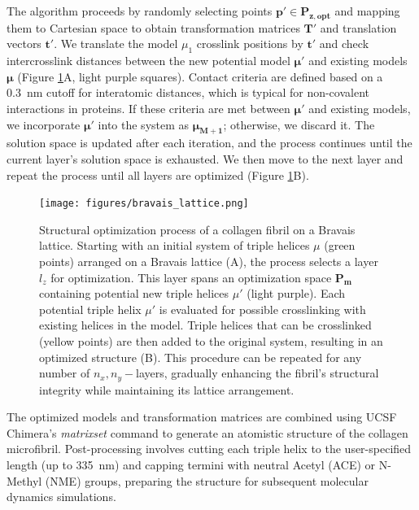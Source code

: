 \documentclass[10pt,letterpaper]{article}
\begin{document}
The algorithm proceeds by randomly selecting points \(\bm{p'} \in \bm{P_{z,\text{opt}}}\) and mapping them to Cartesian space to obtain transformation matrices \(\bm{T'}\) and translation vectors \(\bm{t'}\). We translate the model \(\mu_1\) crosslink positions by \(\bm{t'}\) and check intercrosslink distances between the new potential model \(\bm{\mu'}\) and existing models \(\bm{\mu}\) (Figure \ref{fig:bravais_lattice}A, light purple squares). Contact criteria are defined based on a \SI{0.3}{\nano\meter} cutoff for interatomic distances, which is typical for non-covalent interactions in proteins. If these criteria are met between \(\bm{\mu'}\) and existing models, we incorporate \(\bm{\mu'}\) into the system as \(\bm{\mu_{M+1}}\); otherwise, we discard it. The solution space is updated after each iteration, and the process continues until the current layer's solution space is exhausted. We then move to the next layer and repeat the process until all layers are optimized (Figure \ref{fig:bravais_lattice}B).

\begin{figure}[!t]
    \centering
    \texttt{[image: figures/bravais\_lattice.png]}
    \caption{Structural optimization process of a collagen fibril on a Bravais lattice. Starting with an initial system of triple helices \(\mu\) (green points) arranged on a Bravais lattice (A), the process selects a layer \(l_z\) for optimization. This layer spans an optimization space \(\bm{P_m}\) containing potential new triple helices \(\mu'\) (light purple). Each potential triple helix \(\mu'\) is evaluated for possible crosslinking with existing helices in the model. Triple helices that can be crosslinked (yellow points) are then added to the original system, resulting in an optimized structure (B). This procedure can be repeated for any number of \(n_x, n_y-\)layers, gradually enhancing the fibril's structural integrity while maintaining its lattice arrangement.}
    \label{fig:bravais_lattice}
\end{figure}

The optimized models and transformation matrices are combined using UCSF Chimera's \textit{matrixset} command to generate an atomistic structure of the collagen microfibril. Post-processing involves cutting each triple helix to the user-specified length (up to \SI{335}{\nano\meter}) and capping termini with neutral Acetyl (ACE) or N-Methyl (NME) groups, preparing the structure for subsequent molecular dynamics simulations.
\end{document}
